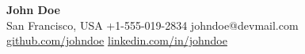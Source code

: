 \documentclass[11pt,letterpaper]{article}
\begin{document}
\begin{center}
    {\Huge \textbf{John Doe}} \\ \vspace{4pt}
    San Francisco, USA \textbar{} +1-555-019-2834 \textbar{} johndoe@devmail.com \\
    \href{https://github.com/johndoe}{github.com/johndoe} \textbar{} \href{https://linkedin.com/in/johndoe}{linkedin.com/in/johndoe}
\end{center}

\vspace{8pt}








\end{document}

